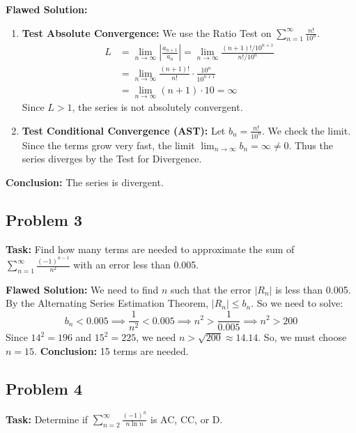 \documentclass{article}
\begin{document}
\textbf{Flawed Solution:}
\begin{enumerate}
    \item \textbf{Test Absolute Convergence:} We use the Ratio Test on $\sum_{n=1}^{\infty} \frac{n!}{10^n}$.
    \begin{align*}
        L &= \lim_{n \to \infty} \left| \frac{a_{n+1}}{a_n} \right| = \lim_{n \to \infty} \frac{(n+1)!/10^{n+1}}{n!/10^n} \\
        &= \lim_{n \to \infty} \frac{(n+1)!}{n!} \cdot \frac{10^n}{10^{n+1}} \\
        &= \lim_{n \to \infty} (n+1) \cdot 10 = \infty
    \end{align*}
    Since $L > 1$, the series is not absolutely convergent.
    \item \textbf{Test Conditional Convergence (AST):} Let $b_n = \frac{n!}{10^n}$. We check the limit. Since the terms grow very fast, the limit $\lim_{n \to \infty} b_n = \infty \neq 0$. Thus the series diverges by the Test for Divergence.
\end{enumerate}
\textbf{Conclusion:} The series is divergent.

\subsection*{Problem 3}
\textbf{Task:} Find how many terms are needed to approximate the sum of $\sum_{n=1}^{\infty} \frac{(-1)^{n-1}}{n^2}$ with an error less than 0.005.

\textbf{Flawed Solution:}
We need to find $n$ such that the error $|R_n|$ is less than 0.005. By the Alternating Series Estimation Theorem, $|R_n| \le b_n$. So we need to solve:
\[ b_n < 0.005 \implies \frac{1}{n^2} < 0.005 \implies n^2 > \frac{1}{0.005} \implies n^2 > 200 \]
Since $14^2 = 196$ and $15^2 = 225$, we need $n > \sqrt{200} \approx 14.14$. So, we must choose $n=15$.
\textbf{Conclusion:} 15 terms are needed.

\subsection*{Problem 4}
\textbf{Task:} Determine if $\sum_{n=2}^{\infty} \frac{(-1)^n}{n \ln n}$ is AC, CC, or D.
\end{document}
